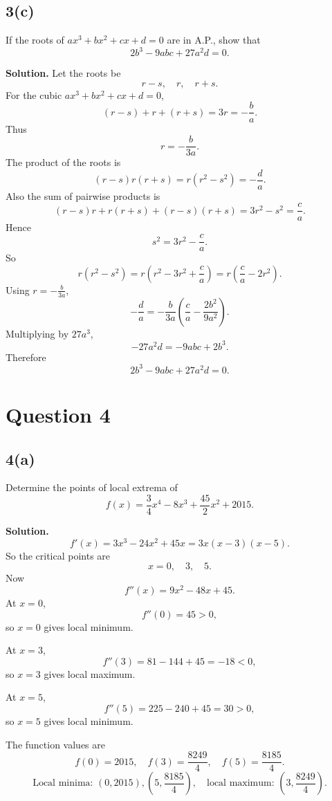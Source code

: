 \documentclass[11pt,a4paper]{article}
\newcommand{\ans}{\textbf{Solution.} }
\newcommand{\final}[1]{\[\boxed{#1}\]}
\begin{document}
\subsection*{3(c)}
\begin{questionbox}
If the roots of $ax^3+bx^2+cx+d=0$ are in A.P., show that
\[
2b^3-9abc+27a^2d=0.
\]
\end{questionbox}
\ans
Let the roots be
\[
r-s,\quad r,
\quad r+s.
\]
For the cubic $ax^3+bx^2+cx+d=0$,
\[
(r-s)+r+(r+s)=3r=-\frac{b}{a}.
\]
Thus
\[
r=-\frac{b}{3a}.
\]
The product of the roots is
\[
(r-s)r(r+s)=r(r^2-s^2)=-\frac{d}{a}.
\]
Also the sum of pairwise products is
\[
(r-s)r+r(r+s)+(r-s)(r+s)=3r^2-s^2=\frac{c}{a}.
\]
Hence
\[
s^2=3r^2-\frac{c}{a}.
\]
So
\[
r(r^2-s^2)=r\left(r^2-3r^2+\frac{c}{a}\right)
=r\left(\frac{c}{a}-2r^2\right).
\]
Using $r=-\frac{b}{3a}$,
\[
-\frac{d}{a}= -\frac{b}{3a}\left(\frac{c}{a}-\frac{2b^2}{9a^2}\right).
\]
Multiplying by $27a^3$,
\[
-27a^2d=-9abc+2b^3.
\]
Therefore
\final{2b^3-9abc+27a^2d=0.}

\section*{Question 4}

\subsection*{4(a)}
\begin{questionbox}
Determine the points of local extrema of
\[
f(x)=\frac34x^4-8x^3+\frac{45}{2}x^2+2015.
\]
\end{questionbox}
\ans
\[
f'(x)=3x^3-24x^2+45x=3x(x-3)(x-5).
\]
So the critical points are
\[
x=0,\quad 3,\quad 5.
\]
Now
\[
f''(x)=9x^2-48x+45.
\]
At $x=0$,
\[
f''(0)=45>0,
\]
so $x=0$ gives local minimum.

At $x=3$,
\[
f''(3)=81-144+45=-18<0,
\]
so $x=3$ gives local maximum.

At $x=5$,
\[
f''(5)=225-240+45=30>0,
\]
so $x=5$ gives local minimum.

The function values are
\[
f(0)=2015,
\quad
f(3)=\frac{8249}{4},
\quad
f(5)=\frac{8185}{4}.
\]
\final{\text{Local minima: }(0,2015),\left(5,\frac{8185}{4}\right),\quad
\text{local maximum: }\left(3,\frac{8249}{4}\right).}
\end{document}
